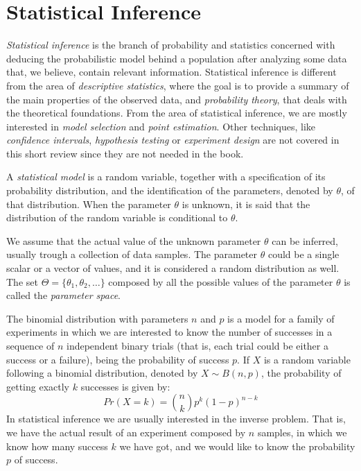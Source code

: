 %
%

\section{Statistical Inference}

\emph{Statistical inference} is the branch of probability and statistics concerned with deducing the probabilistic model behind a population after analyzing some data that, we believe, contain relevant information. Statistical inference is different from the area of \emph{descriptive statistics}, where the goal is to provide a summary of the main properties of the observed data, and \emph{probability theory}, that deals with the theoretical foundations. From the area of statistical inference, we are mostly interested in \emph{model selection} and \emph{point estimation}. Other techniques, like \emph{confidence intervals}, \emph{hypothesis testing} or \emph{experiment design} are not covered in this short review since they are not needed in the book.

\begin{definition}
A \emph{statistical model} is a random variable, together with a specification of its probability distribution, and the identification of the parameters, denoted by $\theta$, of that distribution. When the parameter $\theta$ is unknown, it is said that the distribution of the random variable is conditional to $\theta$.
\end{definition}

We assume that the actual value of the unknown parameter $\theta$ can be inferred, usually trough a collection of data samples. The parameter $\theta$ could be a single scalar or a vector of values, and it is considered a random distribution as well. The set $\Theta = \{ \theta_1, \theta_2, \ldots \}$ composed by all the possible values of the parameter $\theta$ is called the \emph{parameter space}.

\begin{example}
\label{ex:binomial}
The binomial distribution with parameters $n$ and $p$ is a model for a family of experiments in which we are interested to know the number of successes in a sequence of $n$ independent binary trials (that is, each trial could be either a success or a failure), being the probability of success $p$. If $X$ is a random variable following a binomial distribution, denoted by $X \sim B(n,p)$, the probability of getting exactly $k$ successes is given by:
\[
Pr(X=k) = {\binom {n}{k}}p^{k}(1-p)^{n-k} 
\]
In statistical inference we are usually interested in the inverse problem. That is, we have the actual result of an experiment composed by $n$ samples, in which we know how many success $k$ we have got, and we would like to know the probability $p$ of success.
\end {example}

